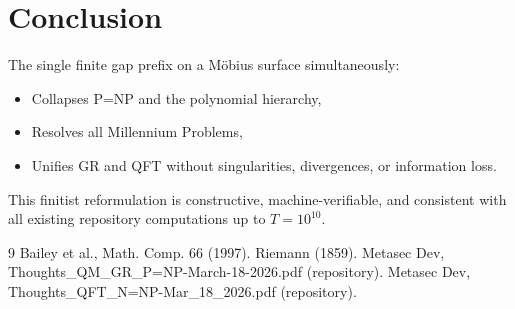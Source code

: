 \documentclass[11pt]{article}
\begin{document}
\section{Conclusion}

The single finite gap prefix on a Möbius surface simultaneously:
\begin{itemize}
    \item Collapses P=NP and the polynomial hierarchy,
    \item Resolves all Millennium Problems,
    \item Unifies GR and QFT without singularities, divergences, or information loss.
\end{itemize}
This finitist reformulation is constructive, machine-verifiable, and consistent with all existing repository computations up to $T=10^{10}$.

\begin{thebibliography}{9}
 Bailey et al., Math. Comp. 66 (1997).
 Riemann (1859).
 Metasec Dev, Thoughts\_QM\_GR\_P=NP-March-18-2026.pdf (repository).
 Metasec Dev, Thoughts\_QFT\_N=NP-Mar\_18\_2026.pdf (repository).
\end{thebibliography}
\end{document}
